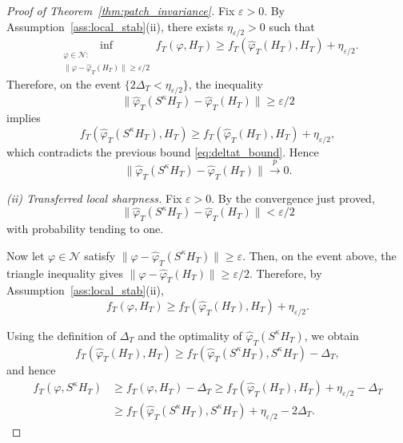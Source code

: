 \documentclass[12pt]{article}
\numberwithin{equation}{section}
\begin{document}
\begin{proof}[Proof of Theorem~\ref{thm:patch_invariance}]
Fix $\varepsilon>0$. By Assumption~\ref{ass:local_stab}(ii), there exists $\eta_{\varepsilon/2}>0$ such that
\begin{equation}
\inf_{\substack{\varphi\in\mathcal N:\\
\|\varphi-\hat{\varphi}_T(H_T)\|\ge\varepsilon/2}}
f_T(\varphi,H_T)
\ge
f_T(\hat{\varphi}_T(H_T),H_T)+\eta_{\varepsilon/2}.
\end{equation}
Therefore, on the event $\{2\Delta_T<\eta_{\varepsilon/2}\}$, the inequality
\begin{equation}
\|\hat{\varphi}_T(S^\kappa H_T)-\hat{\varphi}_T(H_T)\|\ge\varepsilon/2
\end{equation}
implies
\begin{equation}
f_T(\hat{\varphi}_T(S^\kappa H_T),H_T)
\ge
f_T(\hat{\varphi}_T(H_T),H_T)+\eta_{\varepsilon/2},
\end{equation}
which contradicts the previous bound \eqref{eq:deltat_bound}.
Hence
\begin{equation}
\|\hat{\varphi}_T(S^\kappa H_T)-\hat{\varphi}_T(H_T)\|
\overset{p}{\longrightarrow}0.
\end{equation}

\noindent
\textit{(ii) Transferred local sharpness.}
Fix $\varepsilon>0$. By the convergence just proved,
\begin{equation}
\|\hat{\varphi}_T(S^\kappa H_T)-\hat{\varphi}_T(H_T)\|
<\varepsilon/2
\end{equation}
with probability tending to one.

Now let $\varphi\in\mathcal N$ satisfy
$\|\varphi-\hat{\varphi}_T(S^\kappa H_T)\|\ge\varepsilon$.
Then, on the event above, the triangle inequality gives
$\|\varphi-\hat{\varphi}_T(H_T)\|
\ge
\varepsilon/2$.
Therefore, by Assumption~\ref{ass:local_stab}(ii),
\begin{equation}
f_T(\varphi,H_T)
\ge
f_T(\hat{\varphi}_T(H_T),H_T)+\eta_{\varepsilon/2}.
\end{equation}

Using the definition of $\Delta_T$ and the optimality of $\hat{\varphi}_T(S^\kappa H_T)$,
we obtain
\begin{equation}
f_T(\hat{\varphi}_T(H_T),H_T)
\ge
f_T(\hat{\varphi}_T(S^\kappa H_T),S^\kappa H_T)-\Delta_T,
\end{equation}
and hence
\begin{align}
f_T(\varphi,S^\kappa H_T)
&\ge
f_T(\varphi,H_T)-\Delta_T
\ge
f_T(\hat{\varphi}_T(H_T),H_T)+\eta_{\varepsilon/2}-\Delta_T \\
&\ge
f_T(\hat{\varphi}_T(S^\kappa H_T),S^\kappa H_T)
+\eta_{\varepsilon/2}-2\Delta_T.
\end{align}


\end{proof}
\end{document}
